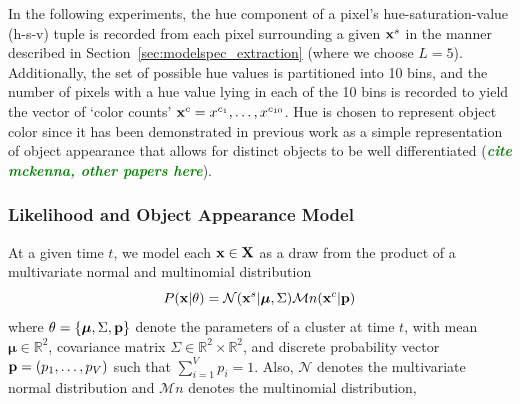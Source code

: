 \documentclass[smallcondensed, final]{svjour3}
\newcommand{\willie}[1]{\textcolor{green}{\textsf{\emph{\textbf{\textcolor{green}{#1}}}}}}
\begin{document}
In the following experiments, the hue component of a pixel's hue-saturation-value (h-s-v) tuple is recorded from each pixel surrounding a given $\bold{x}^{s}$ in the manner described in Section~\ref{sec:modelspec_extraction} (where we choose $L=5$). Additionally, the set of possible hue values is partitioned into 10 bins, and the number of pixels with a hue value lying in each of the 10 bins is recorded to yield the vector of `color counts' $\bold{x}^{c} = x^{c_{1}}, \ldots, x^{c_{10}}$. Hue is chosen to represent object color since it has been demonstrated in previous work as a simple representation of object appearance that allows for distinct objects to be well differentiated (\willie{cite mckenna, other papers here}).






\subsubsection{Likelihood and Object Appearance Model}

At a given time $t$, we model each $\bold{x} \in \bold{X}$ as a draw from the product of a multivariate normal and multinomial distribution
\begin{equation}
\label{likelihood}
P(\bold{x}|\theta) = \mathcal{N}(\bold{x}^{s} | \boldsymbol{\mu}, \Sigma)  \mathcal{M}n(\bold{x}^{c} | \bold{p})
\end{equation}
where $\theta = \{ \boldsymbol{\mu}, \Sigma, \bold{p} \}$ denote the parameters of a cluster at time $t$, with mean $\boldsymbol{\mu} \in \mathbb{R}^{2}$, covariance matrix $\Sigma \in \mathbb{R}^{2} \times \mathbb{R}^{2}$, and discrete probability vector $\bold{p} = (p_{1}, \ldots, p_{V})$ such that $\sum_{i=1}^{V}p_{i} = 1$. Also, $\mathcal{N}$ denotes the multivariate normal distribution and $\mathcal{M}n$ denotes the multinomial distribution, 
\end{document}

